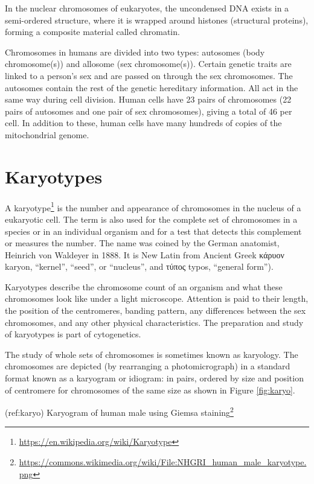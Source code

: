 \documentclass[]{book}
\let\rmarkdownfootnote\footnote%
\def\footnote{\protect\rmarkdownfootnote}
\renewcommand{\href}[2]{#2\footnote{\url{#1}}}
\begin{document}
In the nuclear chromosomes of eukaryotes, the uncondensed DNA exists in
a semi-ordered structure, where it is wrapped around histones
(structural proteins), forming a composite material called chromatin.

Chromosomes in humans are divided into two types: autosomes (body
chromosome(s)) and allosome (sex chromosome(s)). Certain genetic traits
are linked to a person's sex and are passed on through the sex
chromosomes. The autosomes contain the rest of the genetic hereditary
information. All act in the same way during cell division. Human cells
have 23 pairs of chromosomes (22 pairs of autosomes and one pair of sex
chromosomes), giving a total of 46 per cell. In addition to these, human
cells have many hundreds of copies of the mitochondrial genome.

\section{Karyotypes}\label{karyotypes}

A \href{https://en.wikipedia.org/wiki/Karyotype}{karyotype} is the
number and appearance of chromosomes in the nucleus of a eukaryotic
cell. The term is also used for the complete set of chromosomes in a
species or in an individual organism and for a test that detects this
complement or measures the number. The name was coined by the German
anatomist, Heinrich von Waldeyer in 1888. It is New Latin from Ancient
Greek κάρυον karyon, ``kernel'', ``seed'', or ``nucleus'', and τύπος
typos, ``general form'').

Karyotypes describe the chromosome count of an organism and what these
chromosomes look like under a light microscope. Attention is paid to
their length, the position of the centromeres, banding pattern, any
differences between the sex chromosomes, and any other physical
characteristics. The preparation and study of karyotypes is part of
cytogenetics.

The study of whole sets of chromosomes is sometimes known as karyology.
The chromosomes are depicted (by rearranging a photomicrograph) in a
standard format known as a karyogram or idiogram: in pairs, ordered by
size and position of centromere for chromosomes of the same size as
shown in Figure \ref{fig:karyo}.

(ref:karyo)
\href{https://commons.wikimedia.org/wiki/File:NHGRI_human_male_karyotype.png}{Karyogram
of human male using Giemsa staining}
\end{document}
